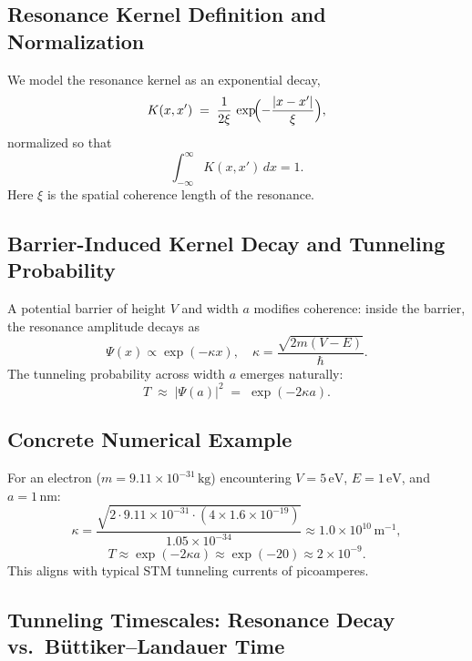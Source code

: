 \subsection{Resonance Kernel Definition and Normalization}

We model the resonance kernel as an exponential decay,
\begin{equation}\label{eq:kernel_def}
K(x,x') \;=\; \frac{1}{2\xi}\,\exp\!\Bigl(-\frac{|x - x'|}{\xi}\Bigr),
\end{equation}
normalized so that
\begin{equation}\label{eq:kernel_norm}
\int_{-\infty}^{\infty} K(x,x')\,dx = 1.
\end{equation}
Here $\xi$ is the spatial coherence length of the resonance.

\subsection{Barrier-Induced Kernel Decay and Tunneling Probability}

A potential barrier of height $V$ and width $a$ modifies coherence: inside the barrier, the resonance amplitude decays as
\begin{equation}\label{eq:psi_decay}
\Psi(x)\propto \exp(-\kappa x),
\quad
\kappa = \frac{\sqrt{2m(V - E)}}{\hbar}.
\end{equation}
The tunneling probability across width $a$ emerges naturally:
\begin{equation}\label{eq:tunnel_prob}
T \;\approx\;\bigl|\Psi(a)\bigr|^2
\;=\;\exp(-2\kappa a).
\end{equation}

\subsection{Concrete Numerical Example}

For an electron ($m=9.11\times10^{-31}\,\mathrm{kg}$) encountering $V=5\,\mathrm{eV}$, $E=1\,\mathrm{eV}$, and $a=1\,\mathrm{nm}$:
\[
\kappa
=\frac{\sqrt{2\cdot9.11\times10^{-31}\cdot(4\times1.6\times10^{-19})}}{1.05\times10^{-34}}
\approx1.0\times10^{10}\,\mathrm{m^{-1}},
\]
\[
T\approx \exp(-2\kappa a) \approx \exp(-20)\approx 2\times10^{-9}.
\]
This aligns with typical STM tunneling currents of picoamperes.

\subsection{Tunneling Timescales: Resonance Decay vs.\ Büttiker–Landauer Time}

